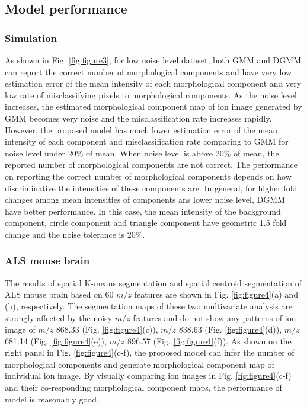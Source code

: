 \documentclass{bioinfo}
\begin{document}
\subsection{Model performance}
\subsubsection{Simulation}
As shown in Fig. \ref{fig:figure3}, for low noise level dataset, both GMM and DGMM can report the correct number of morphological components and have very low estimation error of the mean intensity of each morphological component and very low rate of misclassifying pixels to morphological components. As the noise level increases, the estimated morphological component map of ion image generated by GMM becomes very noise and the misclassification rate increases rapidly. However, the proposed model has much lower estimation error of the mean intensity of each component and misclassification rate comparing to GMM for noise level under 20\% of mean. When noise level is above 20\% of mean, the reported number of morphological components are not correct. The performance on reporting the correct number of morphological components depends on how discriminative the intensities of these components are. In general, for higher fold changes among mean intensities of components ans lower noise level, DGMM have better performance. In this case, the mean intensity of the background component,  circle component and triangle component have geometric 1.5 fold change and the noise tolerance is 20\%.\\
\subsubsection{ALS mouse brain}
The results of spatial K-means segmentation and spatial centroid segmentation of ALS mouse brain based on 60 $m/z$ features are shown in  Fig. \ref{fig:figure4}(a) and (b), respectively. The segmentation maps of these two multivariate analysis are strongly affected by the noisy $m/z$ features and do not show any patterns of ion image of $m/z$ 868.33 (Fig. \ref{fig:figure4}(c)), $m/z$ 838.63 (Fig. \ref{fig:figure4}(d)), $m/z$ 681.14 (Fig. \ref{fig:figure4}(e)), $m/z$ 896.57 (Fig. \ref{fig:figure4}(f)). As shown on the right panel in Fig. \ref{fig:figure4}(c-f), the proposed model can infer the number of morphological components and generate morphological component map of individual ion image. By visually comparing ion images in Fig. \ref{fig:figure4}(c-f) and their co-responding morphological component maps, the performance of model is reasonably good.
\end{document}
